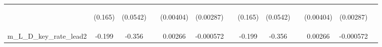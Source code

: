 \documentclass[]{article}
\begin{document}
\begin{center}
\begin{tabular}{lcccccccccccc}
\vspace{4pt} & \begin{footnotesize}(0.165)\end{footnotesize} & \begin{footnotesize}(0.0542)\end{footnotesize} & \begin{footnotesize}\end{footnotesize} & \begin{footnotesize}(0.00404)\end{footnotesize} & \begin{footnotesize}(0.00287)\end{footnotesize} & \begin{footnotesize}\end{footnotesize} & \begin{footnotesize}(0.165)\end{footnotesize} & \begin{footnotesize}(0.0542)\end{footnotesize} & \begin{footnotesize}\end{footnotesize} & \begin{footnotesize}(0.00404)\end{footnotesize} & \begin{footnotesize}(0.00287)\end{footnotesize} & \begin{footnotesize}\end{footnotesize} \\
m\_L\_D\_key\_rate\_lead2 & -0.199 & -0.356 &  & 0.00266 & -0.000572 &  & -0.199 & -0.356 &  & 0.00266 & -0.000572 &  \\

\end{tabular}
\end{center}
\end{document}
